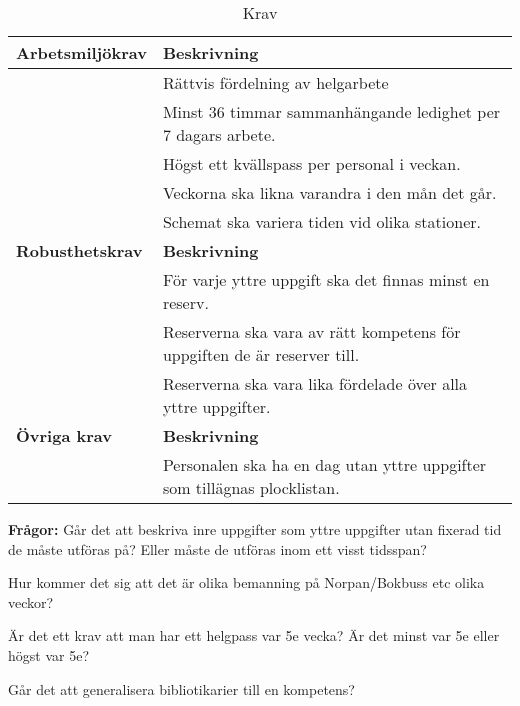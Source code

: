 \begin{table}
\caption{Krav}
\label{tab3}
\begin{tabular}[H]{|l|l|}
\hline
\textbf{Arbetsmiljökrav} & \textbf{Beskrivning} \\ \hline
 & Rättvis fördelning av helgarbete \
\\ \hline 
 & Minst 36 timmar sammanhängande ledighet per 7 dagars arbete.
\\ \hline 
 & Högst ett kvällspass per personal i veckan.
\\ \hline 
 & Veckorna ska likna varandra i den mån det går.
\\ \hline 
 & Schemat ska variera tiden vid olika stationer.
\\ \hline 

\textbf{Robusthetskrav} & \textbf{Beskrivning} \\ \hline
 & För varje yttre uppgift ska det finnas minst en reserv.
\\ \hline 
 & Reserverna ska vara av rätt kompetens för uppgiften de är reserver till.
\\ \hline 
 & Reserverna ska vara lika fördelade över alla yttre uppgifter.
\\ \hline 

\textbf{Övriga krav} & \textbf{Beskrivning} \\ \hline
 & Personalen ska ha en dag utan yttre uppgifter som tillägnas plocklistan.
\\ \hline 
\end{tabular}
\end{table}
\medskip

\textbf{Frågor:} Går det att beskriva inre uppgifter som yttre uppgifter utan fixerad tid de måste utföras på? Eller måste de utföras inom ett visst tidsspan?

Hur kommer det sig att det är olika bemanning på Norpan/Bokbuss etc olika veckor?

Är det ett krav att man har ett helgpass var 5e vecka? Är det minst var 5e eller högst var 5e?

Går det att generalisera bibliotikarier till en kompetens?

